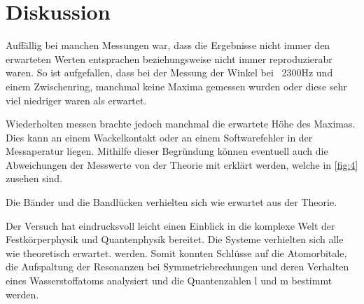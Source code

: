 \section{Diskussion}
\label{sec:Diskussion}

Auffällig bei manchen Messungen war, dass die Ergebnisse nicht immer den erwarteten Werten entsprachen beziehungsweise nicht immer reproduzierabr waren. So ist aufgefallen,
dass bei der Messung der Winkel bei ~2300Hz und einem Zwischenring, manchmal keine Maxima gemessen wurden oder diese sehr viel niedriger waren als erwartet. 

\noindent
Wiederholten messen brachte jedoch manchmal die erwartete Höhe des Maximas. Dies kann an einem Wackelkontakt oder an einem Softwarefehler in der Messaperatur liegen.
Mithilfe dieser Begründung können eventuell auch die Abweichungen der Messwerte von der Theorie mit erklärt werden, welche in \autoref{fig:4} zusehen sind.

\noindent
Die Bänder und die Bandlücken verhielten sich wie erwartet aus der Theorie.

\noindent
Der Versuch hat eindrucksvoll leicht einen Einblick in die komplexe Welt der Festkörperphysik und Quantenphysik bereitet. Die Systeme verhielten sich alle wie 
theoretisch erwartet. werden. Somit konnten Schlüsse auf die Atomorbitale, die Aufspaltung der Resonanzen bei Symmetriebrechungen und deren Verhalten eines Wasserstoffatoms
analysiert und die Quantenzahlen l und m bestimmt werden.


